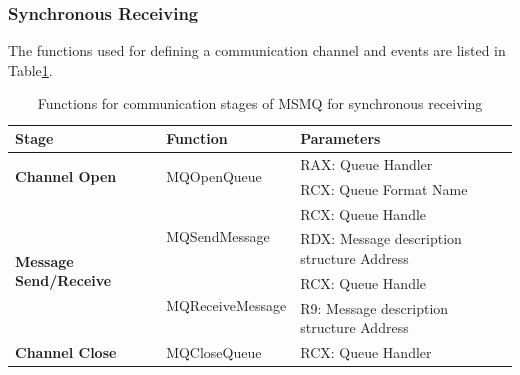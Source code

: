 \subsubsection{Synchronous Receiving}
The functions used for defining a communication channel and events are listed in Table\ref{msmqsynfunctions}.
    \begin{table}[h]
        \centering
        \caption{Functions for communication stages of MSMQ for synchronous receiving}
        \label{msmqsynfunctions}
        \begin{tabular}{|l|l|l|}
            \hline
             \textbf{Stage} & \textbf{Function}& \textbf{Parameters}  \\
             \hline
             \multirow{2}{*}{{\textbf{Channel Open}}}
             &\multirow{2}{*}{{MQOpenQueue}} &  RAX: Queue Handler\\
              \cline{3-3} 
             & &  RCX: Queue Format Name\\
            \hline
             \multirow{4}{*}{{\textbf{Message Send/Receive}}}
             &\multirow{2}{*}{MQSendMessage} &  RCX: Queue Handle \\
              \cline{3-3} 
             &&  RDX: Message description structure Address \\
            \cline{2-3}
             & \multirow{2}{*}{MQReceiveMessage}&  RCX: Queue Handle \\
              \cline{3-3} 
              &&  R9: Message description structure Address \\
            \hline
            \textbf{Channel Close} &MQCloseQueue & RCX: Queue Handler \\
            \hline
        \end{tabular}
    \end{table}


